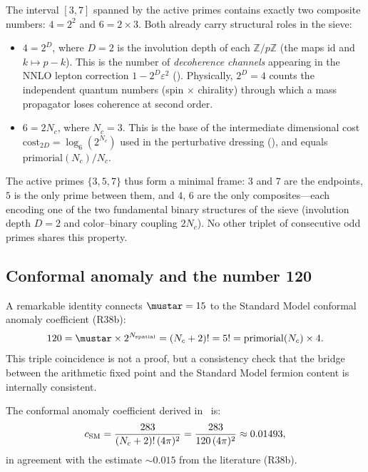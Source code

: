 \documentclass[12pt,a4paper]{article}
\begin{document}
\begin{remark}
\label{rem:composites_4_6}
The interval $[3,7]$ spanned by the active primes contains exactly
two composite numbers: $4 = 2^2$ and $6 = 2 \times 3$. Both
already carry structural roles in the sieve:
\begin{itemize}[nosep]
\item $4 = 2^D$, where $D = 2$ is the involution depth of each
  $\mathbb{Z}/p\mathbb{Z}$ (the maps $\mathrm{id}$ and $k \mapsto p-k$).
  This is the number of \emph{decoherence channels} appearing in the
  NNLO lepton correction $1 - 2^D \varepsilon^2$ (\cite{companion_physics}).
  Physically, $2^D = 4$ counts the independent quantum numbers
  (spin $\times$ chirality) through which a mass propagator loses
  coherence at second order.
\item $6 = 2 N_c$, where $N_c = 3$.  This is the base of the
  intermediate dimensional cost $\mathrm{cost}_{2D}
  = \log_6(2^{N_c})$ used in the perturbative dressing
  (\cite{companion_physics}), and equals $\mathrm{primorial}(N_c)/N_c$.
\end{itemize}
The active primes $\{3, 5, 7\}$ thus form a minimal frame:
$3$ and $7$ are the endpoints, $5$ is the only prime between them,
and $4$, $6$ are the only composites---each encoding one of the
two fundamental binary structures of the sieve (involution depth
$D = 2$ and color--binary coupling $2 N_c$). No other triplet of
consecutive odd primes shares this property.
\end{remark}

\subsection{Conformal anomaly and the number 120}
\label{sec:ch8_conformal}

A remarkable identity connects $\mustar = 15$ to the Standard Model
conformal anomaly coefficient (R38b):
\begin{equation}
  120 = \mustar \times 2^{N_{\rm spatial}} = (N_c + 2)! = 5! = \mathrm{primorial}(N_c) \times 4.
  \label{eq:conformal_120}
\end{equation}
This triple coincidence is not a proof, but a consistency check that
the bridge between the arithmetic fixed point and the Standard Model
fermion content is internally consistent.

The conformal anomaly coefficient derived in~\cite{companion_physics} is:
\begin{equation}
  c_{\rm SM} = \frac{283}{(N_c+2)!\,(4\pi)^2} = \frac{283}{120\,(4\pi)^2}
  \approx 0.01493,
  \label{eq:c_SM_preview}
\end{equation}
in agreement with the estimate $\sim 0.015$ from the literature (R38b).
\end{document}
